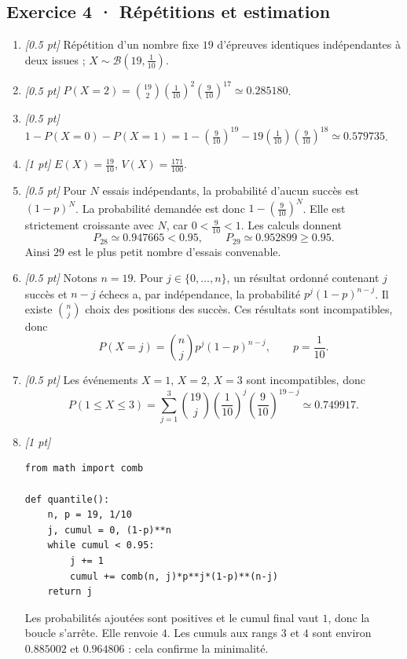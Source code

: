 \subsection*{Exercice 4 · Répétitions et estimation}\begin{enumerate}

\item \textit{[\num{0,5} pt]} Répétition d'un nombre fixe $19$ d'épreuves identiques indépendantes à deux issues ; $X\sim\mathcal B(19,\frac{1}{10})$.

\item \textit{[\num{0,5} pt]} $P(X=2)=\binom{19}2(\frac{1}{10})^2(\frac{9}{10})^{17}\simeq\num{0,285180}$.

\item \textit{[\num{0,5} pt]} $1-P(X=0)-P(X=1)=1-(\frac{9}{10})^{19}-19(\frac{1}{10})(\frac{9}{10})^{18}\simeq\num{0,579735}$.

\item \textit{[1 pt]} $E(X)=\frac{19}{10}$, $V(X)=\frac{171}{100}$.

\item \textit{[\num{0,5} pt]} Pour $N$ essais indépendants, la probabilité d'aucun succès est $(1-p)^N$. La probabilité demandée est donc $1-(\frac{9}{10})^N$. Elle est strictement croissante avec $N$, car $0<\frac{9}{10}<1$. Les calculs donnent
\[P_{28}\simeq\num{0,947665}<\num{0,95},\qquad P_{29}\simeq\num{0,952899}\ge\num{0,95}.\]
Ainsi $29$ est le plus petit nombre d'essais convenable.

\item \textit{[\num{0,5} pt]} Notons $n=19$. Pour $j\in\{0,\ldots,n\}$, un résultat ordonné contenant $j$ succès et $n-j$ échecs a, par indépendance, la probabilité $p^j(1-p)^{n-j}$. Il existe $\binom nj$ choix des positions des succès. Ces résultats sont incompatibles, donc
\[P(X=j)=\binom nj p^j(1-p)^{n-j},\qquad p=\frac{1}{10}.\]

\item \textit{[\num{0,5} pt]} Les événements $X=1$, $X=2$, $X=3$ sont incompatibles, donc
\[P(1\le X\le3)=\sum_{j=1}^3\binom{19}j(\frac{1}{10})^j(\frac{9}{10})^{19-j}\simeq\num{0,749917}.\]


\item \textit{[1 pt]} 
\begin{lstlisting}
from math import comb

def quantile():
    n, p = 19, 1/10
    j, cumul = 0, (1-p)**n
    while cumul < 0.95:
        j += 1
        cumul += comb(n, j)*p**j*(1-p)**(n-j)
    return j
\end{lstlisting}
Les probabilités ajoutées sont positives et le cumul final vaut $1$, donc la boucle s'arrête. Elle renvoie $4$. Les cumuls aux rangs $3$ et $4$ sont environ $\num{0,885002}$ et $\num{0,964806}$ : cela confirme la minimalité.

\end{enumerate}

\fi

\fi

